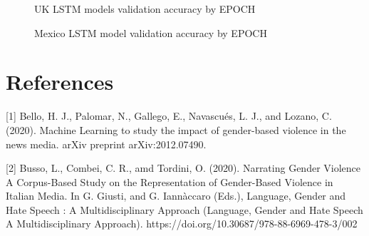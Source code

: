 \documentclass{article}
\begin{document}
\begin{figure}[H]
	\caption{\label{fig:my-label1} UK LSTM models validation accuracy by EPOCH}
\end{figure}

\begin{figure}[H]
	\caption{\label{fig:my-label1} Mexico LSTM model validation accuracy by EPOCH}
\end{figure}



\section{References}\label{sec_ref}

[1] Bello, H. J., Palomar, N., Gallego, E., Navascués, L. J., and Lozano, C. (2020). Machine Learning to study the impact of gender-based violence in the news media. arXiv preprint arXiv:2012.07490.

[2] Busso, L., Combei, C. R., amd Tordini, O. (2020). Narrating Gender Violence A Corpus-Based Study on the Representation of Gender-Based Violence in Italian Media. In G. Giusti, and G. Iannàccaro (Eds.), Language, Gender and Hate Speech : A Multidisciplinary Approach (Language, Gender and Hate Speech A Multidisciplinary Approach). https://doi.org/10.30687/978-88-6969-478-3/002
\end{document}
